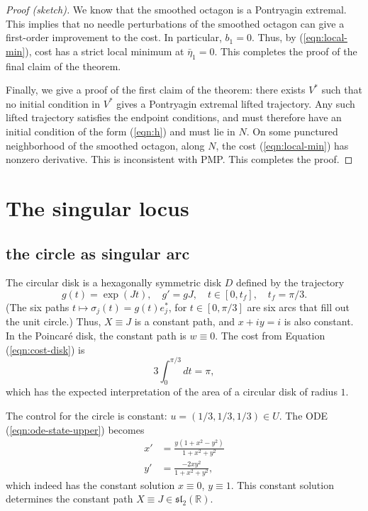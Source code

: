 \documentclass{article}
\theoremstyle{remark}
\newcommand{\ring}[1]{\mathbb{#1}}
\def\sl{\mathfrak{sl}_2(\ring{R})}
\newcommand\ee[1]{e_{#1}^*}
\begin{document}
\begin{proof}[Proof (sketch)]
We know that the smoothed octagon is a Pontryagin extremal.  This
implies that no needle perturbations of the smoothed octagon can give
a first-order improvement to the cost.  In particular, $b_1=0$.  Thus,
by (\ref{eqn:local-min}), cost has a strict local minimum at
$\bar\eta_1=0$.  This completes the proof of the final claim of the
theorem.

Finally, we give a proof of the first claim of the theorem: there
exists $V^*$ such that no initial condition in $V^*$ gives a
Pontryagin extremal lifted trajectory.  Any such lifted trajectory
satisfies the endpoint conditions, and must therefore have an initial
condition of the form (\ref{eqn:h}) and must lie in $N$.  On some punctured neighborhood
of the smoothed octagon, along $N$, the cost
(\ref{eqn:local-min}) has nonzero derivative.  This is inconsistent
with PMP. This completes the proof.
\end{proof}

\section{The singular locus}
\label{sec:sing}


\subsection{the circle as singular arc}\label{sec:circle}

The circular disk is a hexagonally symmetric disk $D$ defined by the
trajectory
\begin{equation}\label{eqn:circle}
g(t) = \exp(J t),
\quad g' = g J,\quad t\in [0,t_f],\quad t_f=\pi/3.
\end{equation}
(The six paths $t\mapsto \sigma_j(t)=g(t) \ee{j}$, for $t\in[0,\pi/3]$
are six arcs that fill out the unit circle.)  Thus, $X\equiv J$ is a
constant path, and $x+iy = i$ is also constant.  In the Poincar\'e
disk, the constant path is $w\equiv 0$.  The cost from Equation
(\ref{eqn:cost-disk}) is
\[
3 \int_0^{\pi/3} dt = \pi,
\]
which has the expected interpretation of the area of
a circular disk of radius $1$.

The control for the circle is constant:
$u=(1/3,1/3,1/3)\in U$.  The ODE (\ref{eqn:ode-state-upper})
becomes
\begin{align*}
x'& = \frac{y (1+ x^2-y^2)}{1+x^2+y^2}\\
y'& = \frac{-2 x y^2}{1+x^2+y^2},
\end{align*}
which indeed has the constant solution $x\equiv0$, $y\equiv1$.  This
constant solution determines the constant path $X\equiv J\in \sl$.
\end{document}
